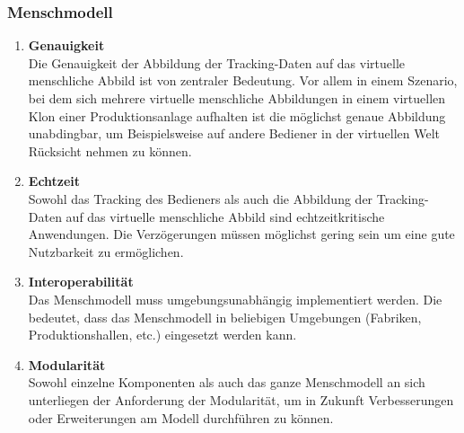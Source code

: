 \subsubsection{Menschmodell}
\begin{enumerate}
	\item \textbf{Genauigkeit} \\
	Die Genauigkeit der Abbildung der Tracking-Daten auf das virtuelle menschliche Abbild ist von zentraler Bedeutung. Vor allem in einem Szenario, bei dem sich mehrere virtuelle menschliche Abbildungen in einem virtuellen Klon einer Produktionsanlage aufhalten ist die möglichst genaue Abbildung unabdingbar, um Beispielsweise auf andere Bediener in der virtuellen Welt Rücksicht nehmen zu können.
	\item \textbf{Echtzeit} \\
	Sowohl das Tracking des Bedieners als auch die Abbildung der Tracking-Daten auf das virtuelle menschliche Abbild sind echtzeitkritische Anwendungen. Die Verzögerungen müssen möglichst gering sein um eine gute Nutzbarkeit zu ermöglichen.
	\item \textbf{Interoperabilität} \\
	Das Menschmodell muss umgebungsunabhängig implementiert werden. Die bedeutet, dass das Menschmodell in beliebigen Umgebungen (Fabriken, Produktionshallen, etc.) eingesetzt werden kann.
	\item \textbf{Modularität} \\
	Sowohl einzelne Komponenten als auch das ganze Menschmodell an sich unterliegen der Anforderung der Modularität, um in Zukunft Verbesserungen oder Erweiterungen am Modell durchführen zu können.
\end{enumerate}

